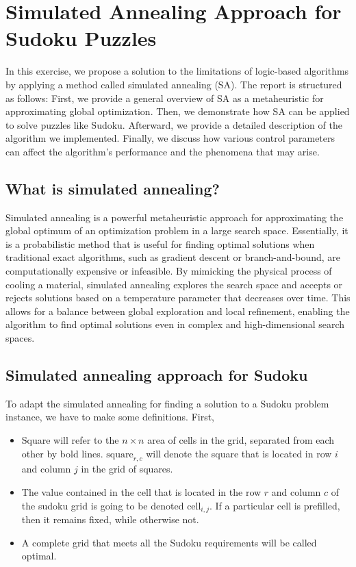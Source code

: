 \documentclass[11pt]{report}
\begin{document}
\section*{Simulated Annealing Approach for Sudoku Puzzles}

In this exercise, we propose a solution to the limitations of logic-based algorithms by applying a method called simulated annealing (SA). The report is structured as follows: First, we provide a general overview of SA as a metaheuristic for approximating global optimization. Then, we demonstrate how SA can be applied to solve puzzles like Sudoku. Afterward, we provide a detailed description of the algorithm we implemented. Finally, we discuss how various control parameters can affect the algorithm's performance and the phenomena that may arise.

\subsection*{What is simulated annealing?}

Simulated annealing is a powerful metaheuristic approach for approximating the global optimum of an optimization problem in a large search space. Essentially, it is a probabilistic method that is useful for finding optimal solutions when traditional exact algorithms, such as gradient descent or branch-and-bound, are computationally expensive or infeasible. By mimicking the physical process of cooling a material, simulated annealing explores the search space and accepts or rejects solutions based on a temperature parameter that decreases over time. This allows for a balance between global exploration and local refinement, enabling the algorithm to find optimal solutions even in complex and high-dimensional search spaces.

\subsection*{Simulated annealing approach for Sudoku}

To adapt the simulated annealing for finding a solution to a Sudoku problem instance, we have to make some definitions. First,
\begin{itemize}
	\item Square will refer to the $n\times n$ area of cells in the grid, separated from each other by bold lines. $\text{square}_{r,c}$ will denote the square that is located in row $i$ and column $j$ in the grid of squares.
	\item The value contained in the cell that is located in the row $r$ and column $c$ of the sudoku grid is going to be denoted $\text{cell}_{i,j}$. If a particular cell is prefilled, then it remains fixed, while otherwise not.
	\item  A complete grid that meets all the Sudoku requirements will be called optimal.
\end{itemize}
\end{document}
